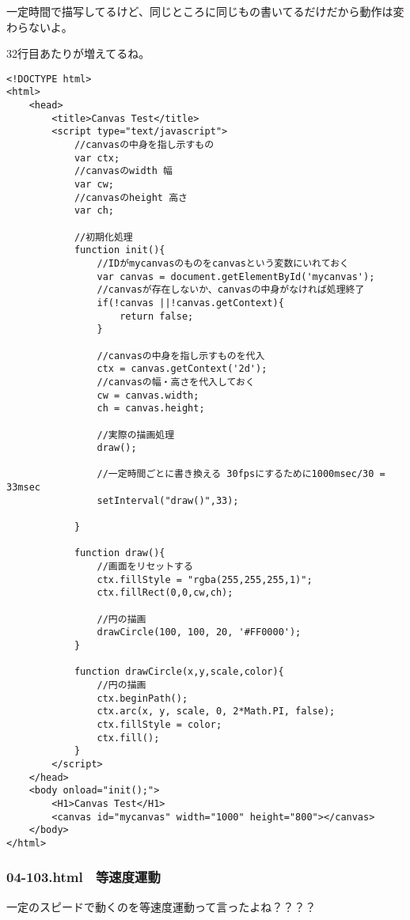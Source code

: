 \documentclass[mingoth,11pt,a4j,uplatex]{jsarticle}
\begin{document}
一定時間で描写してるけど、同じところに同じもの書いてるだけだから動作は変わらないよ。

32行目あたりが増えてるね。
\begin{lstlisting}[caption=一定時間ごとに円を描くけど...動かない]
<!DOCTYPE html>
<html>
	<head>
		<title>Canvas Test</title>
		<script type="text/javascript">
			//canvasの中身を指し示すもの
			var ctx;
			//canvasのwidth 幅
			var cw;
			//canvasのheight 高さ
			var ch;
						
			//初期化処理
			function init(){
				//IDがmycanvasのものをcanvasという変数にいれておく
				var canvas = document.getElementById('mycanvas');
				//canvasが存在しないか、canvasの中身がなければ処理終了
				if(!canvas ||!canvas.getContext){
					return false;
				}
				
				//canvasの中身を指し示すものを代入
				ctx = canvas.getContext('2d');
				//canvasの幅・高さを代入しておく
				cw = canvas.width;
				ch = canvas.height;
				
				//実際の描画処理
				draw();
				
				//一定時間ごとに書き換える 30fpsにするために1000msec/30 = 33msec
				setInterval("draw()",33);

			}
			
			function draw(){
				//画面をリセットする
				ctx.fillStyle = "rgba(255,255,255,1)";
				ctx.fillRect(0,0,cw,ch);
				
				//円の描画
				drawCircle(100, 100, 20, '#FF0000');
			}
			
			function drawCircle(x,y,scale,color){
				//円の描画
				ctx.beginPath();
				ctx.arc(x, y, scale, 0, 2*Math.PI, false);
				ctx.fillStyle = color;
				ctx.fill();
			}
		</script>
	</head>
	<body onload="init();">
		<H1>Canvas Test</H1>
		<canvas id="mycanvas" width="1000" height="800"></canvas>
	</body>
</html>
\end{lstlisting}

\subsubsection{04-103.html　等速度運動}
一定のスピードで動くのを等速度運動って言ったよね？？？？
\end{document}
